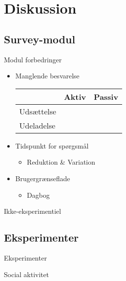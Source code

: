 \section{Diskussion}
\subsection{Survey-modul}
\begin{frame}{Modul forbedringer}
\begin{itemize}
\item Manglende besvarelse\\
\begin{tabular}{|l|l|l|}\cline{2-3}
\multicolumn{1}{l|}{} & Aktiv & Passiv\\\hline
Udsættelse & & \\\hline
Udeladelse & & \\\hline
\end{tabular}
\end{itemize}
\begin{itemize}
\item Tidspunkt for spørgsmål
\begin{itemize}
\item Reduktion \& Variation
\end{itemize}
\item Brugergrænseflade
\begin{itemize}
\item Dagbog
\end{itemize}
\end{itemize}
\end{frame}

\begin{frame}{Ikke-eksperimentiel}
\end{frame}

\subsection{Eksperimenter}

\begin{frame}{Eksperimenter}

\end{frame}

\begin{frame}{Social aktivitet}
\end{frame}

